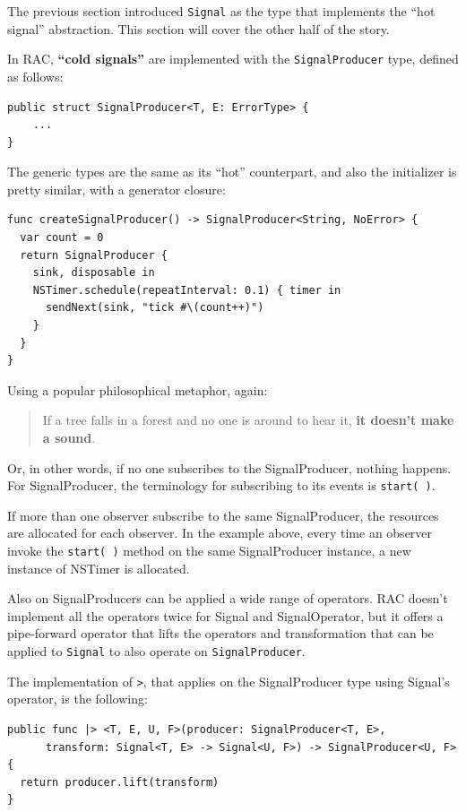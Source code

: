 The previous section introduced \texttt{Signal} as the type that
implements the ``hot signal'' abstraction. This section will cover the
other half of the story.

In RAC, \textbf{``cold signals''} are implemented with the
\texttt{SignalProducer} type, defined as follows:

\begin{verbatim}
public struct SignalProducer<T, E: ErrorType> {
    ...
}
\end{verbatim}

The generic types are the same as its ``hot'' counterpart, and also the
initializer is pretty similar, with a generator closure:

\begin{verbatim}
func createSignalProducer() -> SignalProducer<String, NoError> {
  var count = 0
  return SignalProducer {
    sink, disposable in
    NSTimer.schedule(repeatInterval: 0.1) { timer in
      sendNext(sink, "tick #\(count++)")
    }
  }
}
\end{verbatim}

Using a popular philosophical metaphor, again:

\begin{quote}
If a tree falls in a forest and no one is around to hear it, \textbf{it
doesn't make a sound}.
\end{quote}

Or, in other words, if no one subscribes to the SignalProducer, nothing
happens. For SignalProducer, the terminology for subscribing to its
events is \texttt{start(\ )}.

If more than one observer subscribe to the same SignalProducer, the
resources are allocated for each observer. In the example above, every
time an observer invoke the \texttt{start(\ )} method on the same
SignalProducer instance, a new instance of NSTimer is allocated.

Also on SignalProducers can be applied a wide range of operators. RAC
doesn't implement all the operators twice for Signal and SignalOperator,
but it offers a pipe-forward operator that lifts the operators and
transformation that can be applied to \texttt{Signal} to also operate on
\texttt{SignalProducer}.

The implementation of \texttt{\textbar{}\textgreater{}}, that applies on
the SignalProducer type using Signal's operator, is the following:

\begin{verbatim}
public func |> <T, E, U, F>(producer: SignalProducer<T, E>,
      transform: Signal<T, E> -> Signal<U, F>) -> SignalProducer<U, F> {
  return producer.lift(transform)
}
\end{verbatim}

